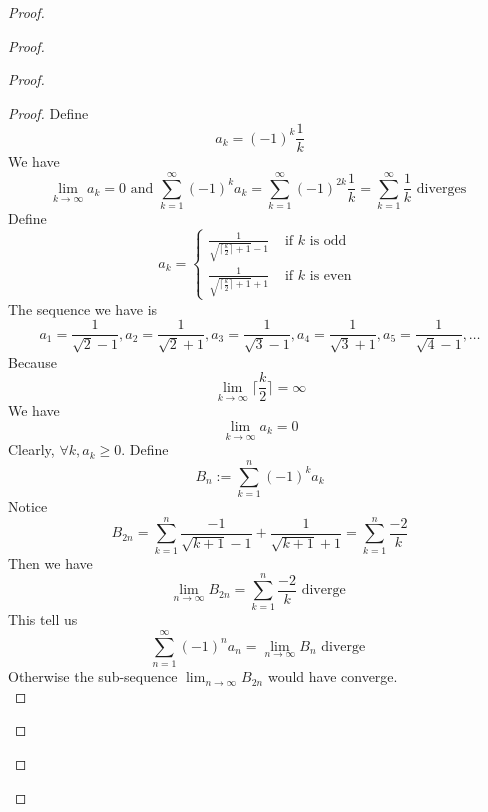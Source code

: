\documentclass{report}
\begin{document}
\begin{proof}
\begin{proof}
\begin{proof}
\begin{proof}
Define
\begin{equation}
a_k=(-1)^k \frac{1}{k}
\end{equation}
We have
\begin{equation}
\lim_{k\to\infty}a_k=0\text{ and }\sum_{k=1}^\infty (-1)^k a_k=\sum_{k=1}^\infty (-1)^{2k}\frac{1}{k}=\sum_{k=1}^\infty \frac{1}{k}\text{ diverges }
\end{equation}
Define
\begin{equation}
a_k=\begin{cases}
\frac{1}{\sqrt{\lceil \frac{k}{2} \rceil +1}-1}& \text{ if $k$ is odd }\\
\frac{1}{\sqrt{\lceil \frac{k}{2} \rceil +1}+1 }& \text{ if $k$ is even }
\end{cases}
\end{equation}
The sequence we have is
\begin{equation}
a_1=\frac{1}{\sqrt{2} -1},a_2=\frac{1}{\sqrt{2} +1},a_3=\frac{1}{\sqrt{3} -1},a_4=\frac{1}{\sqrt{3} +1},a_5=\frac{1}{\sqrt{4} -1},\dots
\end{equation}
Because 
\begin{equation}
\lim_{k\to\infty} \lceil \frac{k}{2}\rceil =\infty
\end{equation}
We have
\begin{equation}
\lim_{k\to\infty} a_k=0
\end{equation}
Clearly, $\forall k,a_k\geq 0$. Define
\begin{equation}
B_n:=\sum_{k=1}^n (-1)^k a_k
\end{equation}
Notice
\begin{equation}
B_{2n}=\sum_{k=1}^n \frac{-1}{\sqrt{k+1}-1}+\frac{1}{\sqrt{k+1} +1}=\sum_{k=1}^n \frac{-2}{k}
\end{equation}
Then we have
\begin{equation}
\lim_{n\to\infty}B_{2n}=\sum_{k=1}^n \frac{-2}{k}\text{ diverge }
\end{equation}
This tell us
\begin{equation}
\sum_{n=1}^\infty (-1)^n a_n=\lim_{n\to\infty}B_{n}\text{ diverge }
\end{equation}
Otherwise the sub-sequence $\lim_{n\to\infty}B_{2n}$ would have converge.\\


\end{proof}
\end{proof}
\end{proof}
\end{proof}
\end{document}
